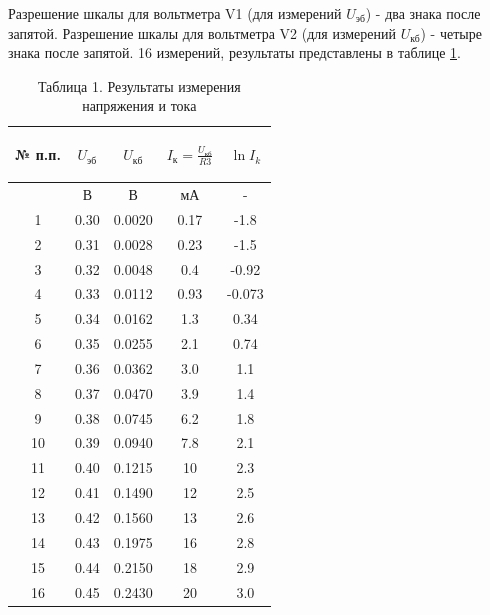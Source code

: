 Разрешение шкалы для вольтметра V1 (для измерений $U_{\text{эб}}$) - два знака после запятой. Разрешение шкалы для вольтметра V2 (для измерений $U_{\text{кб}}$) - четыре знака после запятой. 16 измерений, результаты представлены в таблице \ref{t1}.

\begin{center}
\begin{table}[h!]
\centering
\caption*{Таблица 1. Результаты измерения напряжения и тока}

\label{t1}
\begin{tabular}{|c|c|c|c|c|}
\hline
\begin{minipage}{7mm}
    № п.п. 
\end{minipage}&
\begin{minipage}{3cm}
    \begin{center} $U_{\text{эб}}$ \end{center}
\end{minipage} &
\begin{minipage}{3cm}
    \begin{center} $U_{\text{кб}}$ \end{center}
\end{minipage} &
\begin{minipage}{3cm}
    \begin{center} $I_{\text{к}}=\frac{U_{\text{кб}}}{R3}$ \end{center}
\end{minipage}&
\begin{minipage}{3cm}
   \begin{center} $\ln I_k$ \end{center}
\end{minipage}\\
\hline
{}&В&В&мА&-\\
\hline
1 &  0.30  &  0.0020  &  0.17 & -1.8 \\
2 &  0.31  &  0.0028  & 0.23  & -1.5 \\
3 &  0.32  &  0.0048  &  0.4 & -0.92\\
4 & 0.33  &  0.0112  &  0.93 & -0.073\\
5 & 0.34  &  0.0162  &  1.3 & 0.34\\
6 & 0.35  &  0.0255  &  2.1 & 0.74\\
7 & 0.36  &  0.0362  &  3.0 & 1.1\\
8 & 0.37  &  0.0470  &  3.9 & 1.4\\
9& 0.38  &  0.0745  &   6.2 & 1.8\\
10 &  0.39  &  0.0940  &  7.8 &  2.1\\
11 &  0.40  &  0.1215  &  10 & 2.3\\
12 &  0.41  & 0.1490 &  12 & 2.5\\
13 & 0.42 &  0.1560  &  13 & 2.6\\
14 & 0.43  &  0.1975  &  16 & 2.8\\
15 & 0.44  &  0.2150  & 18  & 2.9\\
16 & 0.45  &  0.2430  &  20 & 3.0\\
\hline
\end{tabular}
\end{table}
\end{center}


